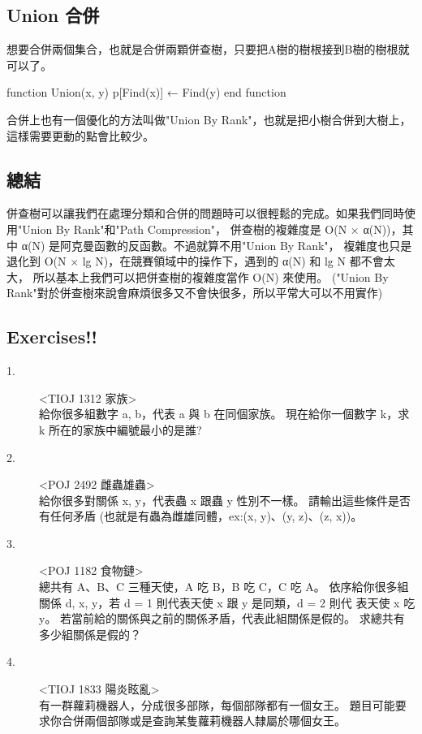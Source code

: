 \documentclass{article}
\begin{document}
\subsection{Union 合併}
想要合併兩個集合，也就是合併兩顆併查樹，只要把A樹的樹根接到B樹的樹根就可以了。

\begin{algorithm}[caption={Union}, label={alg1}]
function Union(x, y)
    p[Find(x)] ← Find(y)
end function
\end{algorithm}

合併上也有一個優化的方法叫做"Union By Rank"，也就是把小樹合併到大樹上，這樣需要更動的點會比較少。\\

\subsection{總結}
併查樹可以讓我們在處理分類和合併的問題時可以很輕鬆的完成。如果我們同時使用"Union By Rank"和"Path Compression"，
併查樹的複雜度是 O(N × α(N))，其中 α(N) 是阿克曼函數的反函數。不過就算不用"Union By Rank"，
複雜度也只是退化到 O(N × lg N)，在競賽領域中的操作下，遇到的 α(N) 和 lg N 都不會太大，
所以基本上我們可以把併查樹的複雜度當作 O(N) 來使用。
("Union By Rank"對於併查樹來說會麻煩很多又不會快很多，所以平常大可以不用實作)

\subsection{Exercises!!}

\begin{description}
\item[ 1.]<TIOJ 1312 家族>\\
給你很多組數字 a, b，代表 a 與 b 在同個家族。
現在給你一個數字 k，求 k 所在的家族中編號最小的是誰?
\item[ 2.]<POJ 2492 雌蟲雄蟲>\\
給你很多對關係 x, y，代表蟲 x 跟蟲 y 性別不一樣。
請輸出這些條件是否有任何矛盾 (也就是有蟲為雌雄同體，ex:(x, y)、(y, z)、(z, x))。
\item[ 3.]<POJ 1182 食物鏈>\\
總共有 A、B、C 三種天使，A 吃 B，B 吃 C，C 吃 A。
依序給你很多組關係 d, x, y，若 d = 1 則代表天使 x 跟 y 是同類，d = 2 則代
表天使 x 吃 y。
若當前給的關係與之前的關係矛盾，代表此組關係是假的。
求總共有多少組關係是假的？
\item[ 4.]<TIOJ 1833 陽炎眩亂>\\
有一群蘿莉機器人，分成很多部隊，每個部隊都有一個女王。
題目可能要求你合併兩個部隊或是查詢某隻蘿莉機器人隸屬於哪個女王。
\end{description} 
\end{document}
